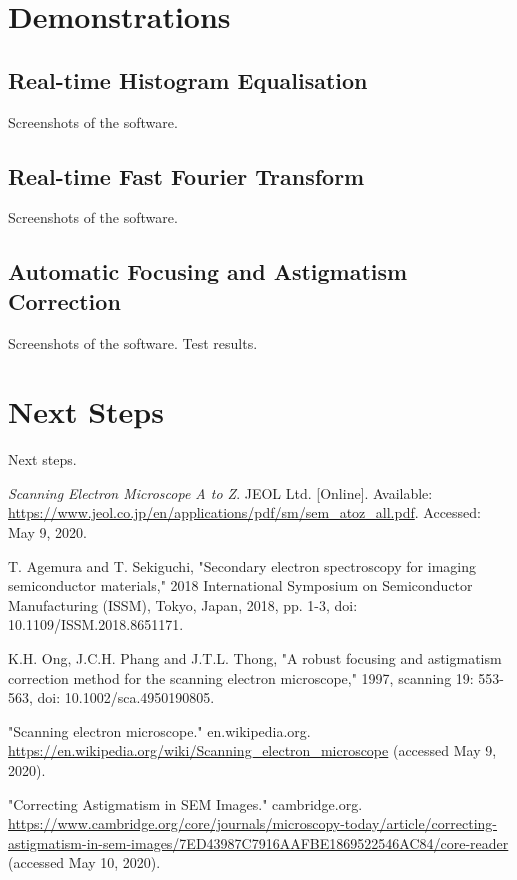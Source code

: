 \documentclass{article}
\begin{document}
\section{Demonstrations}
\subsection{Real-time Histogram Equalisation}
Screenshots of the software.

\subsection{Real-time Fast Fourier Transform}
Screenshots of the software.

\subsection{Automatic Focusing and Astigmatism Correction}
Screenshots of the software.
Test results.

\section{Next Steps}
Next steps.

\newpage
\begin{thebibliography}{}
    \textit{Scanning Electron Microscope A to Z}. JEOL Ltd. [Online]. Available: \url{https://www.jeol.co.jp/en/applications/pdf/sm/sem_atoz_all.pdf}. Accessed: May 9, 2020.

    T. Agemura and T. Sekiguchi, "Secondary electron spectroscopy for imaging semiconductor materials," 2018 International Symposium on Semiconductor Manufacturing (ISSM), Tokyo, Japan, 2018, pp. 1-3, doi: 10.1109/ISSM.2018.8651171.

    K.H. Ong, J.C.H. Phang and J.T.L. Thong, "A robust focusing and astigmatism correction method for the scanning electron microscope," 1997, scanning 19: 553-563, doi: 10.1002/sca.4950190805.
    
    "Scanning electron microscope." en.wikipedia.org. \url{https://en.wikipedia.org/wiki/Scanning_electron_microscope} (accessed May 9, 2020).

    "Correcting Astigmatism in SEM Images." cambridge.org. \url{https://www.cambridge.org/core/journals/microscopy-today/article/correcting-astigmatism-in-sem-images/7ED43987C7916AAFBE1869522546AC84/core-reader} (accessed May 10, 2020).
\end{thebibliography}
\end{document}
